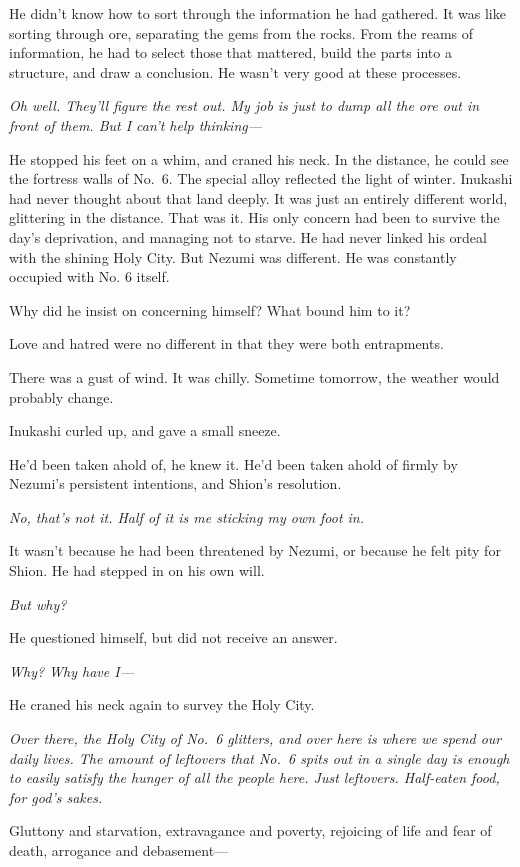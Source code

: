 He didn't know how to sort through the information he had gathered. It
was like sorting through ore, separating the gems from the rocks. From
the reams of information, he had to select those that mattered, build
the parts into a structure, and draw a conclusion. He wasn't very good
at these processes.

\emph{Oh well. They'll figure the rest out. My job is just to dump all the ore
out in front of them. But I can't help thinking---}

He stopped his feet on a whim, and craned his neck. In the distance, he
could see the fortress walls of No.~6. The special alloy reflected the
light of winter. Inukashi had never thought about that land deeply. It
was just an entirely different world, glittering in the distance. That
was it. His only concern had been to survive the day's deprivation, and
managing not to starve. He had never linked his ordeal with the shining
Holy City. But Nezumi was different. He was constantly occupied with No.
6 itself.

Why did he insist on concerning himself? What bound him to it?

Love and hatred were no different in that they were both entrapments.

There was a gust of wind. It was chilly. Sometime tomorrow, the weather
would probably change.

Inukashi curled up, and gave a small sneeze.

He'd been taken ahold of, he knew it. He'd been taken ahold of firmly by
Nezumi's persistent intentions, and Shion's resolution.

\emph{No, that's not it. Half of it is me sticking my own foot in.}

It wasn't because he had been threatened by Nezumi, or because he felt
pity for Shion. He had stepped in on his own will.

\emph{But why?}

He questioned himself, but did not receive an answer.

\emph{Why? Why have I---}

He craned his neck again to survey the Holy City.

\emph{Over there, the Holy City of No.~6 glitters, and over here is where we
spend our daily lives. The amount of leftovers that No.~6 spits out in a
single day is enough to easily satisfy the hunger of all the people
here. Just leftovers. Half-eaten food, for god's sakes.}

Gluttony and starvation, extravagance and poverty, rejoicing of life and
fear of death, arrogance and debasement---

